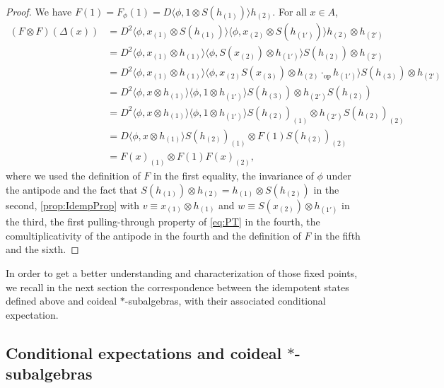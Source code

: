 \documentclass[a4paper,10pt]{amsart}
\newcommand{\eval}[2]{\langle #1 , #2\rangle}
\theoremstyle{definition}
\begin{document}
\begin{proof}
    We have $F(1)= F_\phi(1)= D \eval{\phi}{1 \otimes S(h_{(1)})}h_{(2)}$. For all $x\in A$,
    \begin{align*}
        (F\otimes F)(\Delta(x))
        & =
        D^2 \eval{\phi}{x_{(1)} \otimes S(h_{(1)})}
            \eval{\phi}{x_{(2)} \otimes S(h_{(1')})}
                h_{(2)} \otimes h_{(2')}
        \\ &
        =
        D^2 \eval{\phi}{x_{(1)} \otimes h_{(1)}}
            \eval{\phi}{S(x_{(2)}) \otimes h_{(1')}}
                S(h_{(2)}) \otimes h_{(2')}
        \\ &
        =
        D^2 \eval{\phi}{x_{(1)} \otimes h_{(1)}}
            \eval{\phi}{x_{(2)}
                S(x_{(3)})
                \otimes h_{(2)} \cdot_{\mathrm{op}} h_{(1')}} S(h_{(3)})
                \otimes h_{(2')}
        \\ &
        =
        D^2 \eval{\phi}{x \otimes h_{(1)}}
            \eval{\phi}{1 \otimes h_{(1')}}
                S(h_{(3)}) \otimes h_{(2')} S(h_{(2)})
        \\ &
        =
        D^2 \eval{\phi}{x \otimes h_{(1)}}
            \eval{\phi}{1 \otimes h_{(1')}}
                S(h_{(2)})_{(1)} \otimes h_{(2')} S(h_{(2)})_{(2)}
        \\
        &=
        D \eval{\phi}{x \otimes h_{(1)}}
            S(h_{(2)})_{(1)} \otimes F(1) S(h_{(2)})_{(2)} 
        \\ &
        =
        F(x)_{(1)} \otimes F(1) F(x)_{(2)},
    \end{align*}
    where we used the definition of $F$ in the first equality, the invariance of $\phi$ under the antipode and the fact that $S(h_{(1)}) \otimes h_{(2)}=h_{(1)} \otimes S(h_{(2)})$ in the second, \cref{prop:IdempProp} with $v\equiv x_{(1)} \otimes h_{(1)}$ and $w\equiv S(x_{(2)}) \otimes h_{(1')}$ in the third, the first pulling-through property of \cref{eq:PT} in the fourth, the comultiplicativity of the antipode in the fourth and the definition of $F$ in the fifth and the sixth.
\end{proof}

In order to get a better understanding and characterization of those fixed points, we recall in the next section the correspondence between the idempotent states defined above and coideal $*$-subalgebras, with their associated conditional expectation.

\subsection{Conditional expectations and coideal \texorpdfstring{$\boldsymbol{*}$}{*}-subalgebras}
\label{subsec:expect}
\end{document}
